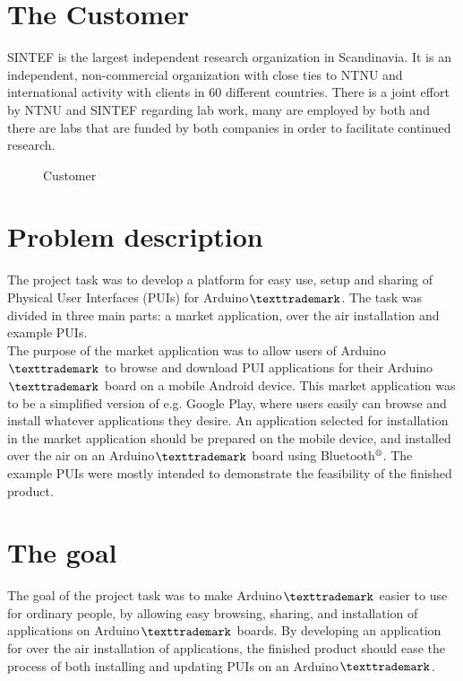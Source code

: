 \section{The Customer}
SINTEF is the largest independent research organization in Scandinavia. It is an independent, non-commercial organization with close ties to NTNU and international activity with clients in 60 different countries. There is a joint effort by NTNU and SINTEF regarding lab work, many are employed by both and there are labs that are funded by both companies in order to facilitate continued research.

\begin{figure}[H]
%
\hfill
{}%
\caption{Customer}
\end{figure}

\section{Problem description}
The project task was to develop a platform for easy use, setup and sharing of Physical User Interfaces (PUIs) for Arduino$\texttrademark$. The task was divided in three main parts: a market application, over the air installation and example PUIs.\\
\newline
The purpose of the market application was to allow users of Arduino$\texttrademark$ to browse and download PUI applications for their Arduino$\texttrademark$ board on a mobile Android device. This market application was to be a simplified version of e.g. Google Play, where users easily can browse and install whatever applications they desire. An application selected for installation in the market application should be prepared on the mobile device, and installed over the air on an Arduino$\texttrademark$ board using Bluetooth$\textsuperscript{\textregistered}$. The example PUIs were mostly intended to demonstrate the feasibility of the finished product.

\section{The goal}
The goal of the project task was to make Arduino$\texttrademark$ easier to use for ordinary people, by allowing easy browsing, sharing, and installation of applications on Arduino$\texttrademark$ boards. By developing an application for over the air installation of applications, the finished product should ease the process of both installing and updating PUIs on an Arduino$\texttrademark$.


